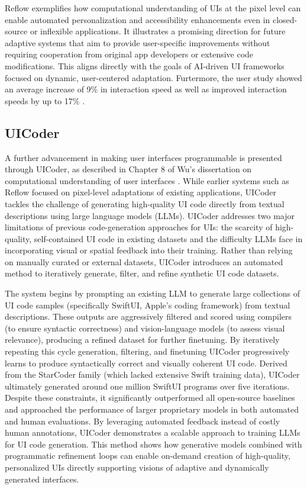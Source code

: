 \documentclass[openany]{book}
\begin{document}
\newpage

Reflow exemplifies how computational understanding of UIs at the pixel level can enable automated personalization and accessibility enhancements even in closed-source or inflexible applications. It illustrates a promising direction for future adaptive systems that aim to provide user-specific improvements without requiring cooperation from original app developers or extensive code modifications. This aligns directly with the goals of AI-driven UI frameworks focused on dynamic, user-centered adaptation. Furtermore, the user study showed an average increase of 9\% in interaction speed as well as improved interaction speeds by up to 17\% \cite{Wu2024}.

\subsection{UICoder}
A further advancement in making user interfaces programmable is presented through UICoder, as described in Chapter 8 of Wu’s dissertation on computational understanding of user interfaces \cite{Wu2024}. While earlier systems such as Reflow focused on pixel-level adaptations of existing applications, UICoder tackles the challenge of generating high-quality UI code directly from textual descriptions using large language models (LLMs).
UICoder addresses two major limitations of previous code-generation approaches for UIs: the scarcity of high-quality, self-contained UI code in existing datasets and the difficulty LLMs face in incorporating visual or spatial feedback into their training. Rather than relying on manually curated or external datasets, UICoder introduces an automated method to iteratively generate, filter, and refine synthetic UI code datasets.

The system begins by prompting an existing LLM to generate large collections of UI code samples (specifically SwiftUI, Apple's coding framework) from textual descriptions. These outputs are aggressively filtered and scored using compilers (to ensure syntactic correctness) and vision-language models (to assess visual relevance), producing a refined dataset for further finetuning. By iteratively repeating this cycle generation, filtering, and finetuning UICoder progressively learns to produce syntactically correct and visually coherent UI code.
Derived from the StarCoder family (which lacked extensive Swift training data), UICoder ultimately generated around one million SwiftUI programs over five iterations. Despite these constraints, it significantly outperformed all open-source baselines and approached the performance of larger proprietary models in both automated and human evaluations.
By leveraging automated feedback instead of costly human annotations, UICoder demonstrates a scalable approach to training LLMs for UI code generation. This method shows how generative models combined with programmatic refinement loops can enable on-demand creation of high-quality, personalized UIs directly supporting visions of adaptive and dynamically generated interfaces.
\end{document}
